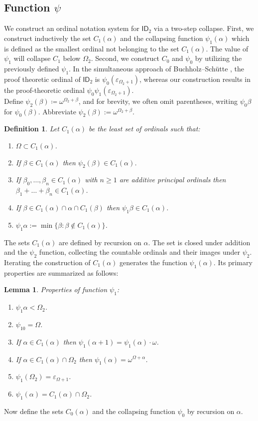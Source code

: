 \documentclass{amsart}
\theoremstyle{plain}
\theoremstyle{plain}
\newtheorem{lemma}[theorem]{Lemma}
\newtheorem*{definition}{Definition}
\newcommand{\ID}{\mathsf{ID}}
\newcommand{\Om}{{\Omega}}
\newcommand{\al}{{\alpha}}
\newcommand{\be}{{\beta}}
\newcommand{\om}{\omega}
\begin{document}
\subsection{Function \texorpdfstring{$\psi$}{psi}} \label{subsec:FunctionPsi}
We construct an ordinal notation system for $\ID_2$ via a two-step collapse. 
First, we construct inductively the set $C_1(\al)$ and the collapsing function $\psi_1(\al)$ which is defined as the smallest ordinal not belonging to the set $C_1(\al)$. The value of $\psi_1$ will collapse $C_1$ below $\Omega_2$.
Second, we construct $C_0$ and $\psi_0$ by utilizing the previously defined $\psi_1$. 
In the simultaneous approach of Buchholz–Schütte \cite{BuchholzSchutte}, the proof theoretic ordinal of $\ID_2$ is $\psi_0(\varepsilon_{\Omega_2+1})$, whereas our construction results in the proof-theoretic ordinal $\psi_0\psi_1(\varepsilon_{\Omega_2+1})$.
\\
Define $\psi_2(\beta) \coloneqq \omega^{\Omega_2+\beta}$, and for brevity, we often omit parentheses, writing $\psi_0\beta$ for $\psi_0(\beta)$.
Abbreviate $\psi_2(\be) := \om^{\Om_2+\be}$.

\begin{definition} 
	Let $C_1(\al)$ be the least set of ordinals such that:
	\begin{enumerate}
		\item $ \Om \subset C_1(\al)$.
		\item If $\be \in C_1(\al)$ then $\psi_2(\be) \in C_1(\al)$.
		\item If $\be_0,\ldots , \be_n \in C_1(\al) $  with $n \geq 1$ are additive principal ordinals then $\be_1+  \ldots  + \be_n \in C_1(\al)$.
		\item If $\be\in C_1(\al)\cap \al \cap C_1(\be)$ then $\psi_1 \be\in C_1(\al)$.
		\item 	 $\psi_1\al:=\min\{\be:\be\not\in C_1(\al)\}$.
	\end{enumerate}
\end{definition}
The sets $C_1(\alpha)$ are defined by recursion on $\alpha$. The set is closed under addition and the $\psi_2$ function, collecting the countable ordinals and their images under $\psi_2$. Iterating the construction of $C_1(\alpha)$ generates the function $\psi_1(\alpha)$. Its primary properties are summarized as follows:
\begin{lemma} Properties of function $\psi_1$:
	\begin{enumerate}
		\item $\psi_1\al<\Om_2$. 
		\item $\psi_10=\Om$.
		\item If $\al\in C_1(\al)$ then $\psi_1(\al+1)=\psi_1(\al)\cdot \om$.
		\item If $\al\in C_1(\al) \cap \Om_2$ then $\psi_1(\al)=\om^{\Om+\al}$.
		\item $\psi_1(\Om_2) = \varepsilon_{\Om+1}$.
		\item $\psi_1(\al)=C_1(\al)\cap \Om_2$.
	\end{enumerate}
\end{lemma}
Now define the sets $C_0(\alpha)$ and the collapsing function $\psi_0$ by recursion on $\alpha$.
\end{document}
